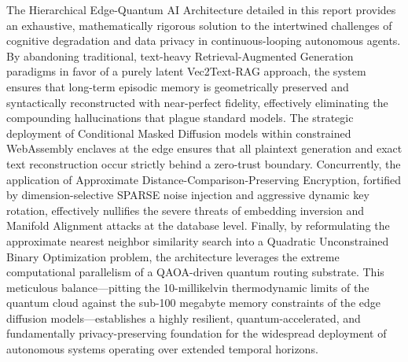 \documentclass[12pt]{article}
\begin{document}
The Hierarchical Edge-Quantum AI Architecture detailed in this report provides an exhaustive, mathematically rigorous solution to the intertwined challenges of cognitive degradation and data privacy in continuous-looping autonomous agents. By abandoning traditional, text-heavy Retrieval-Augmented Generation paradigms in favor of a purely latent Vec2Text-RAG approach, the system ensures that long-term episodic memory is geometrically preserved and syntactically reconstructed with near-perfect fidelity, effectively eliminating the compounding hallucinations that plague standard models. The strategic deployment of Conditional Masked Diffusion models within constrained WebAssembly enclaves at the edge ensures that all plaintext generation and exact text reconstruction occur strictly behind a zero-trust boundary. Concurrently, the application of Approximate Distance-Comparison-Preserving Encryption, fortified by dimension-selective SPARSE noise injection and aggressive dynamic key rotation, effectively nullifies the severe threats of embedding inversion and Manifold Alignment attacks at the database level. Finally, by reformulating the approximate nearest neighbor similarity search into a Quadratic Unconstrained Binary Optimization problem, the architecture leverages the extreme computational parallelism of a QAOA-driven quantum routing substrate. This meticulous balance—pitting the 10-millikelvin thermodynamic limits of the quantum cloud against the sub-100 megabyte memory constraints of the edge diffusion models—establishes a highly resilient, quantum-accelerated, and fundamentally privacy-preserving foundation for the widespread deployment of autonomous systems operating over extended temporal horizons.
\end{document}
